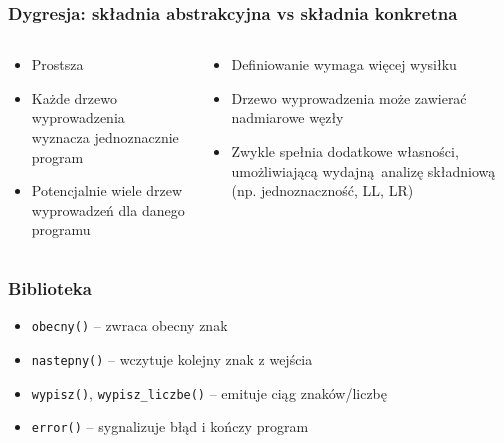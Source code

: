 \documentclass{beamer}
\begin{document}
	\begin{frame}
		\frametitle{Dygresja: składnia abstrakcyjna vs składnia konkretna}
		\begin{columns}
			\begin{column}{0.5\textwidth}
				\newline\newline
			\end{column}
			\begin{column}{0.5\textwidth}
				\newline\newline
			\end{column}
		\end{columns}
		\begin{columns}
			\begin{column}{0.5\textwidth}
				\begin{itemize}
					\item Prostsza
					\item Każde drzewo wyprowadzenia wyznacza jednoznacznie program
					\item Potencjalnie wiele drzew wyprowadzeń dla danego programu
				\end{itemize}
			\end{column}
			\begin{column}{0.5\textwidth}
				\begin{itemize}
					\item Definiowanie wymaga więcej wysiłku
					\item Drzewo wyprowadzenia może zawierać nadmiarowe węzły
					\item Zwykle spełnia dodatkowe własności, umożliwiającą wydajną analizę składniową
					(np. jednoznaczność, LL, LR)
				\end{itemize}

			\end{column}
		\end{columns}
	\end{frame}

	
	\begin{frame}
		\frametitle{Biblioteka}
		\begin{itemize}
		 \item \texttt{obecny()} -- zwraca obecny znak
		 \item \texttt{nastepny()} -- wczytuje kolejny znak z wejścia
		 \item \texttt{wypisz()}, \texttt{wypisz\_liczbe()} -- emituje ciąg znaków/liczbę
		 \item \texttt{error()} -- sygnalizuje błąd i kończy program
		\end{itemize}
	\end{frame}
	
\end{document}
